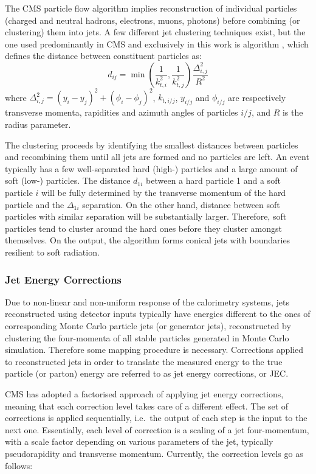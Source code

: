 The CMS particle flow algorithm implies reconstruction of individual particles (charged and neutral hadrons, electrons,
muons, photons) before combining (or clustering) them into jets. A few different jet clustering techniques exist, but
the one used predominantly in CMS and exclusively in this work is \antikt algorithm \autocite{anti-kt}, which defines
the distance between constituent particles as:
\begin{equation}
d_{ij} = \min\left(\frac{1}{k^2_{t,i}},\frac{1}{k^2_{t,j}}\right) \frac{\Delta_{i,j}^2}{R^2}
\end{equation}
where $\Delta_{i,j}^2 = (y_i-y_j)^2 + (\phi_i-\phi_j)^2$, $k_{t,i/j}$, $y_{i/j}$ and $\phi_{i/j}$ are respectively
transverse momenta, rapidities and azimuth angles of particles $i/j$, and $R$ is the radius parameter.

The clustering proceeds by identifying the smallest distances between particles and recombining them until all jets are
formed and no particles are left. An event typically has a few well-separated hard (high-\pt) particles and a large
amount of soft (low-\pt) particles. The distance $d_{1i}$ between a hard particle 1 and a soft particle $i$ will be
fully determined by the transverse momentum of the hard particle and the $\Delta_{1i}$ separation. On the other hand,
distance between soft particles with similar separation will be substantially larger. Therefore, soft particles tend to
cluster around the hard ones before they cluster amongst themselves. On the output, the \antikt algorithm forms
conical jets with boundaries resilient to soft radiation.

\subsubsection{Jet Energy Corrections}
\label{sss:JEC}

Due to non-linear and non-uniform response of the calorimetry systems, jets reconstructed using detector inputs
typically have energies different to the ones of corresponding Monte Carlo particle jets (or generator jets),
reconstructed by clustering the four-momenta of all stable particles generated in Monte Carlo simulation. Therefore some
mapping procedure is necessary. Corrections applied to  reconstructed jets in order to translate the measured energy to
the true particle (or parton) energy are referred to as jet energy corrections, or JEC.

CMS has adopted a factorised approach of applying jet energy corrections, meaning that each correction level takes care
of a different effect. The set of corrections is applied sequentially, i.e.\ the output of each step is the input to the
next one. Essentially, each level of correction is a scaling of a jet four-momentum, with a scale factor depending on
various parameters of the jet, typically pseudorapidity and transverse momentum. Currently, the correction levels go as
follows:

